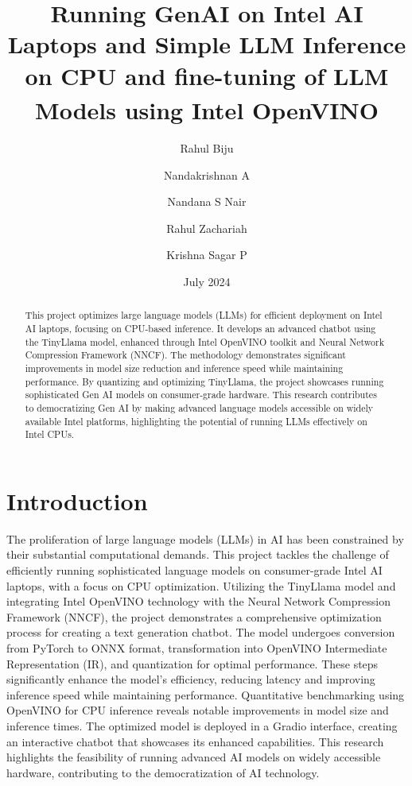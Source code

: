 \documentclass{josis}
\begin{document}


\title{Running GenAI on Intel AI Laptops and Simple LLM Inference on CPU and fine-tuning of LLM Models using Intel\textsuperscript{\textregistered} OpenVINO\texttrademark}

\author{Rahul Biju}
\author{Nandakrishnan A }
\author{Nandana S Nair}
\author{Rahul Zachariah}
\author{Krishna Sagar P}
\date{July 2024}
\maketitle
\begin{abstract}
This project optimizes large language models (LLMs) for efficient deployment on Intel AI laptops, focusing on CPU-based inference. It develops an advanced chatbot using the TinyLlama model, enhanced through Intel\textregistered{} OpenVINO\texttrademark{} toolkit and Neural Network Compression Framework (NNCF). The methodology demonstrates significant improvements in model size reduction and inference speed while maintaining performance. By quantizing and optimizing TinyLlama, the project showcases running sophisticated Gen AI models on consumer-grade hardware. This research contributes to democratizing Gen AI by making advanced language models accessible on widely available Intel platforms, highlighting the potential of running LLMs effectively on Intel CPUs.
\end{abstract}
\section{Introduction}
The proliferation of large language models (LLMs) in AI has been constrained by their substantial computational demands. This project tackles the challenge of efficiently running sophisticated language models on consumer-grade Intel AI laptops, with a focus on CPU optimization. Utilizing the TinyLlama model and integrating Intel\textregistered{} OpenVINO\texttrademark{} technology with the Neural Network Compression Framework (NNCF), the project demonstrates a comprehensive optimization process for creating a text generation chatbot. The model undergoes conversion from PyTorch to ONNX format, transformation into OpenVINO Intermediate Representation (IR), and quantization for optimal performance. These steps significantly enhance the model's efficiency, reducing latency and improving inference speed while maintaining performance. Quantitative benchmarking using OpenVINO for CPU inference reveals notable improvements in model size and inference times. The optimized model is deployed in a Gradio interface, creating an interactive chatbot that showcases its enhanced capabilities. This research highlights the feasibility of running advanced AI models on widely accessible hardware, contributing to the democratization of AI technology.
\end{document}
